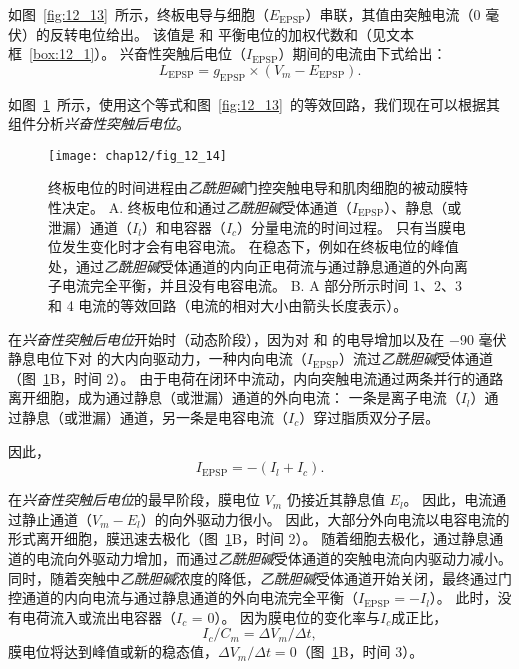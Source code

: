 如图~\ref{fig:12_13}~所示，终板电导与细胞（$E_{\text{EPSP}}$）串联，其值由突触电流（0 毫伏）的反转电位给出。
该值是  和  平衡电位的加权代数和（见文本框~\ref{box:12_1}）。
兴奋性突触后电位（$I_{\text{EPSP}}$）期间的电流由下式给出：
\begin{equation}\label{excitatory_potential}
	L_{\text{EPSP}} = g_{\text{EPSP}} \times (V_m - E_{\text{EPSP}}).
\end{equation}


如图~\ref{fig:12_14}~所示，使用这个等式和图~\ref{fig:12_13}~的等效回路，我们现在可以根据其组件分析\textit{兴奋性突触后电位}。


\begin{figure}[htbp]
	\centering
	\texttt{[image: chap12/fig\_12\_14]}
	\caption{终板电位的时间进程由\textit{乙酰胆碱}门控突触电导和肌肉细胞的被动膜特性决定。
		A. 终板电位和通过\textit{乙酰胆碱}受体通道（$I_{\text{EPSP}}$）、静息（或泄漏）通道（$ I_l $）和电容器（$ I_c $）分量电流的时间过程。
		只有当膜电位发生变化时才会有电容电流。
		在稳态下，例如在终板电位的峰值处，通过\textit{乙酰胆碱}受体通道的内向正电荷流与通过静息通道的外向离子电流完全平衡，并且没有电容电流。
		B. A 部分所示时间 1、2、3 和 4 电流的等效回路（电流的相对大小由箭头长度表示）。}
	\label{fig:12_14}
\end{figure}


在\textit{兴奋性突触后电位}开始时（动态阶段），因为对  和  的电导增加以及在 −90 毫伏静息电位下对  的大内向驱动力，一种内向电流（$I_{\text{EPSP}}$）流过\textit{乙酰胆碱}受体通道 （图~\ref{fig:12_14}B，时间 2）。
由于电荷在闭环中流动，内向突触电流通过两条并行的通路离开细胞，成为通过静息（或泄漏）通道的外向电流：
一条是离子电流（$I_l$）通过静息（或泄漏）通道，另一条是电容电流（$I_c$）穿过脂质双分子层。


因此，
\begin{equation}\label{ionic_current}
	I_{\text{EPSP}} = -(I_l + I_c).
\end{equation}

在\textit{兴奋性突触后电位}的最早阶段，膜电位 $V_m$ 仍接近其静息值 $ E_l $。
因此，电流通过静止通道（$V_m - E_l$）的向外驱动力很小。
因此，大部分外向电流以电容电流的形式离开细胞，膜迅速去极化（图~\ref{fig:12_14}B，时间 2）。
随着细胞去极化，通过静息通道的电流向外驱动力增加，而通过\textit{乙酰胆碱}受体通道的突触电流向内驱动力减小。
同时，随着突触中\textit{乙酰胆碱}浓度的降低，\textit{乙酰胆碱}受体通道开始关闭，最终通过门控通道的内向电流与通过静息通道的外向电流完全平衡（$I_{\text{EPSP}} = - I_l$）。
此时，没有电荷流入或流出电容器（$ I_c $ = 0）。
因为膜电位的变化率与$ I_c $成正比，
%
\begin{equation}\label{rate_potential}
	I_c / C_m = \Delta V_m / \Delta t,
\end{equation}
%
膜电位将达到峰值或新的稳态值，$\Delta V_m / \Delta t = 0 $（图~\ref{fig:12_14}B，时间 3）。


